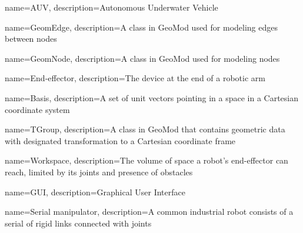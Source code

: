 {
        name=AUV,
        description={Autonomous Underwater Vehicle}
}

{
        name=GeomEdge,
        description={A class in GeoMod used for modeling edges between nodes}
}

{
        name=GeomNode,
        description={A class in GeoMod used for modeling nodes}
}

{
        name=End-effector,
        description={The device at the end of a robotic arm}
}


{
        name=Basis,
        description={A set of unit vectors pointing in a space in a Cartesian coordinate system}
}

{
        name=TGroup,
        description={A class in GeoMod that contains geometric data with designated transformation to a Cartesian coordinate frame}
}

{
        name=Workspace,
        description={The volume of space a robot's end-effector can reach, limited by its joints and presence of obstacles}
}

{
        name=GUI,
        description={Graphical User Interface}
}

{
        name=Serial manipulator,
        description={A common industrial robot consists of a serial of rigid links connected with joints}
}

